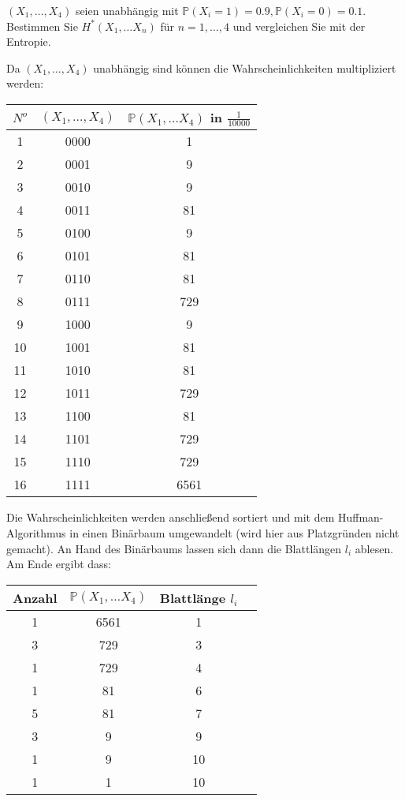 \begin{uebsp}
\begin{Exercise}[label=ex:10.6]
$(X_1 , \dots , X_4 )$ seien unabhängig mit $\mathbb{P}(X_i = 1) = 0.9, \mathbb{P}(X_i = 0) = 0.1.$
Bestimmen Sie $H^* (X_1 , \dots X_n )$ für $n = 1, \dots , 4$ und vergleichen Sie mit
der Entropie.
\end{Exercise}
\begin{Answer}
Da $(X_1 , \dots , X_4 )$ unabhängig sind können die Wahrscheinlichkeiten multipliziert werden:\\

\begin{center}
\begin{tabular}{|c|c|c|}
\hline 
$N^o$ & $(X_1 , \dots , X_4 )$ & $\mathbb{P}(X_1, \dots X_4)$ in $\frac{1}{10000}$ \\\hline
    1 & 0000 & 1 \\\hline
    2 & 0001 & 9 \\\hline
    3 & 0010 & 9 \\\hline
    4 & 0011 & 81 \\\hline
    5 & 0100 & 9 \\\hline
    6 & 0101 & 81 \\\hline
    7 & 0110 & 81 \\\hline
    8 & 0111 & 729 \\\hline
    9 & 1000 & 9 \\\hline
    10 & 1001 & 81 \\\hline
    11 & 1010 & 81 \\\hline
    12 & 1011 & 729 \\\hline
    13 & 1100 & 81 \\\hline
    14 & 1101 & 729 \\\hline
    15 & 1110 & 729 \\\hline
    16 & 1111 & 6561 \\\hline
\end{tabular}
\end{center}


Die Wahrscheinlichkeiten werden anschließend sortiert und mit dem Huffman-Algorithmus in einen Binärbaum umgewandelt (wird hier aus Platzgründen nicht gemacht). An Hand des Binärbaums lassen sich dann die Blattlängen $l_i$ ablesen. 
Am Ende ergibt dass:\\
\begin{center}
\begin{tabular}{|c|c|c|c|}
\hline Anzahl & $\mathbb{P}(X_1, \dots X_4)$ & Blattlänge $l_i$ \\\hline
1 & 6561 & 1 \\\hline
3 & 729 & 3 \\\hline
1 & 729 & 4 \\\hline
1 & 81 & 6 \\\hline
5 & 81 & 7 \\\hline
3 & 9 & 9 \\\hline
1 & 9 & 10 \\\hline
1 & 1 & 10\\\hline 
\end{tabular}\\
\end{center}



\end{Answer}
\end{uebsp}
